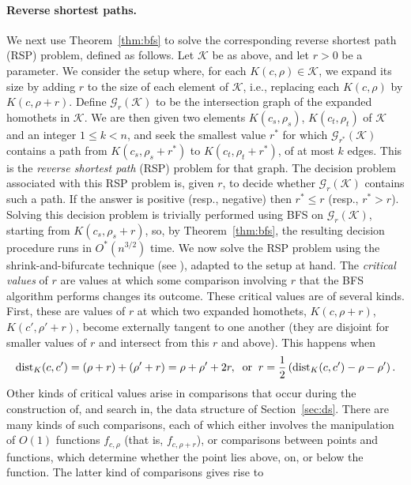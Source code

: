 \documentclass[11pt]{article}
\def\dist{{\rm dist}}
\def\G{\mathcal{G}}
\def\K{\mathcal{K}}
\theoremstyle{definition}
\begin{document}
\paragraph{Reverse shortest paths.}
We next use Theorem~\ref{thm:bfs} to solve the corresponding reverse shortest path (RSP) problem,
defined as follows.
Let $\K$ be as above, and let $r>0$ be a parameter. We consider the setup where, for each 
$K(c,\rho)\in\K$, we expand its size by adding $r$ to the size of each element of $\K$, 
i.e., replacing each $K(c,\rho)$ by $K(c,\rho+r)$.
Define $\G_r(\K)$ to
be the intersection graph of the expanded homothets in $\K$. We are then given two elements
$K(c_s,\rho_s)$, $K(c_t,\rho_t)$ of $\K$ and an integer $1\le k < n$, and seek the smallest value
$r^*$ for which $\G_{r^*}(\K)$ contains a path from $K(c_s,\rho_s+r^*)$ to $K(c_t,\rho_t+r^*)$,
of at most $k$ edges. This is the \emph{reverse shortest path} (RSP) problem for that graph.
%
The decision problem associated with this RSP problem is, given $r$, to decide whether $\G_r(\K)$
contains such a path. If the answer is positive (resp., negative) then $r^*\le r$ (resp.,
$r^* > r$). Solving this decision problem is trivially performed using BFS on $\G_r(\K)$, 
starting from $K(c_s,\rho_s+r)$, so, by Theorem~\ref{thm:bfs}, the resulting decision procedure
runs in $O^*(n^{3/2})$ time.
%
We now solve the RSP problem using the shrink-and-bifurcate technique (see \cite{BFKKS,CH,KKSS}),
adapted to the setup at hand. The \emph{critical values} of $r$ are values at which some comparison involving
$r$ that the BFS algorithm performs changes its outcome. These critical values are of several kinds. 
First, these are 
values of $r$ at which two expanded homothets, $K(c,\rho+r)$, $K(c',\rho'+r)$, become externally 
tangent to one another (they are disjoint for smaller values of $r$ and intersect from this $r$ 
and above). This happens when
\begin{equation} \label{eq:crit} 
\dist_K(c,c') = (\rho+r) + (\rho'+r) = \rho + \rho' + 2r, \;\;\text{or} \;\; 
r = \frac12 \left( \dist_K(c,c') - \rho - \rho' \right) .
\end{equation}
%
Other kinds of critical values arise in comparisons that occur during the construction of, and 
search in, the data structure of Section~\ref{sec:ds}. There are many kinds of such comparisons,
each of which either involves the manipulation of $O(1)$ functions $f_{c,\rho}$ (that is, 
$f_{c,\rho+r}$), or comparisons between points and functions, which determine whether the
point lies above, on, or below the function. The latter kind of comparisons gives rise to
\end{document}
